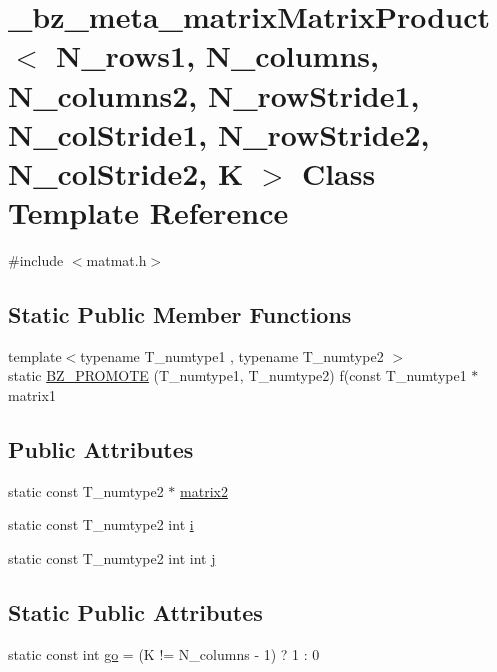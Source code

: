 \hypertarget{class__bz__meta__matrixMatrixProduct}{}\section{\+\_\+bz\+\_\+meta\+\_\+matrix\+Matrix\+Product$<$ N\+\_\+rows1, N\+\_\+columns, N\+\_\+columns2, N\+\_\+row\+Stride1, N\+\_\+col\+Stride1, N\+\_\+row\+Stride2, N\+\_\+col\+Stride2, K $>$ Class Template Reference}
\label{class__bz__meta__matrixMatrixProduct}


{\ttfamily \#include $<$matmat.\+h$>$}

\subsection*{Static Public Member Functions}
\begin{DoxyCompactItemize}
\item 
{\footnotesize template$<$typename T\+\_\+numtype1 , typename T\+\_\+numtype2 $>$ }\\static \hyperlink{class__bz__meta__matrixMatrixProduct_a4ca0043c97439f7f976c350892f7fc34}{B\+Z\+\_\+\+P\+R\+O\+M\+O\+T\+E} (T\+\_\+numtype1, T\+\_\+numtype2) f(const T\+\_\+numtype1 $\ast$matrix1
\end{DoxyCompactItemize}
\subsection*{Public Attributes}
\begin{DoxyCompactItemize}
\item 
static const T\+\_\+numtype2 $\ast$ \hyperlink{class__bz__meta__matrixMatrixProduct_abefcbc18300a7175a21565393c0fbceb}{matrix2}
\item 
static const T\+\_\+numtype2 int \hyperlink{class__bz__meta__matrixMatrixProduct_a02729718fa4999d36b6dc932dff9fedc}{i}
\item 
static const T\+\_\+numtype2 int int \hyperlink{class__bz__meta__matrixMatrixProduct_a1dcd8bc4716cac12f2579278f88a6ebe}{j}
\end{DoxyCompactItemize}
\subsection*{Static Public Attributes}
\begin{DoxyCompactItemize}
\item 
static const int \hyperlink{class__bz__meta__matrixMatrixProduct_acec73c7d5ead254daf02083688c23398}{go} = (K != N\+\_\+columns -\/ 1) ? 1 \+: 0
\end{DoxyCompactItemize}



